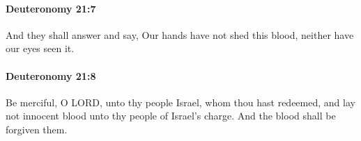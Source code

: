 		\paragraph{Deuteronomy 21:7} %
			\label{DEUTERONOMY-21-7}

			And they shall answer and say, Our hands have not shed this blood, neither have our eyes seen it.


		\paragraph{Deuteronomy 21:8} %
			\label{DEUTERONOMY-21-8}

			Be merciful, O LORD, unto thy people Israel, whom thou hast redeemed, and lay not innocent blood unto thy people of Israel's charge. And the blood shall be forgiven them.



